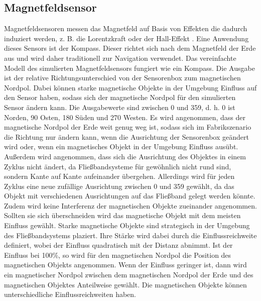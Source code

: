 \subsection{Magnetfeldsensor}
Magnetfeldsensoren messen das Magnetfeld auf Basis von Effekten die dadurch induziert werden, z. B. die Lorentzkraft oder der Hall-Effekt \cite{thompsonMEMS}.
Eine Anwendung dieses Sensors ist der Kompass.
Dieser richtet sich nach dem Magnetfeld der Erde aus und wird daher traditionell zur Navigation verwendet.
\newpage
Das vereinfachte Modell des simulierten Magnetfeldsensors fungiert wie ein Kompass.
Die Ausgabe ist der relative Richtungsunterschied von der Sensorenbox zum magnetischen Nordpol.
Dabei können starke magnetische Objekte in der Umgebung Einfluss auf den Sensor haben,
sodass sich der magnetische Nordpol für den simulierten Sensor ändern kann.
Die Ausgabewerte sind zwischen 0 und 359, d. h. 0 ist Norden, 90 Osten, 180 Süden und 270 Westen.
\newline
\newline
Es wird angenommen, dass der magnetische Nordpol der Erde weit genug weg ist,
sodass sich im Fabrikszenario die Richtung nur ändern kann, wenn die Ausrichtung der Sensorenbox geändert wird
oder, wenn ein magnetisches Objekt in der Umgebung Einfluss ausübt.
Außerdem wird angenommen, dass sich die Ausrichtung des Objektes in einem Zyklus nicht ändert,
da Fließbandsysteme für gewöhnlich nicht rund sind, sondern Kante auf Kante aufeinander übergehen.
Allerdings wird für jeden Zyklus eine neue zufällige Ausrichtung zwischen 0 und 359 gewählt,
da das Objekt mit verschiedenen Ausrichtungen auf das Fließband gelegt werden könnte.
Zudem wird keine Interferenz der magnetischen Objekte zueinander angenommen.
Sollten sie sich überschneiden wird das magnetische Objekt mit dem meisten Einfluss gewählt.
\newline
\newline
Starke magnetische Objekte sind strategisch in der Umgebung des Fließbandsystems plaziert.
Ihre Stärke wird dabei durch die Einflussreichweite definiert, wobei der Einfluss quadratisch mit der Distanz abnimmt.
Ist der Einfluss bei 100\%, so wird für den magnetischen Nordpol die Position des magnetischen Objekts angenommen.
Wenn der Einfluss geringer ist, dann wird ein magnetischer Nordpol zwischen dem magnetischen Nordpol der Erde und des magnetischen Objektes Anteilweise gewählt.
Die magnetischen Objekte können unterschiedliche Einflussreichweiten haben.
\newline
\newline
